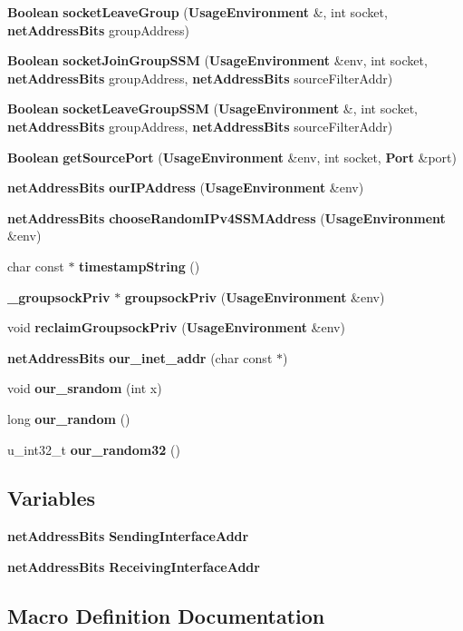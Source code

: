 \begin{DoxyCompactItemize}
\item 
{\bf Boolean} {\bf socket\+Leave\+Group} ({\bf Usage\+Environment} \&, int socket, {\bf net\+Address\+Bits} group\+Address)
\item 
{\bf Boolean} {\bf socket\+Join\+Group\+S\+S\+M} ({\bf Usage\+Environment} \&env, int socket, {\bf net\+Address\+Bits} group\+Address, {\bf net\+Address\+Bits} source\+Filter\+Addr)
\item 
{\bf Boolean} {\bf socket\+Leave\+Group\+S\+S\+M} ({\bf Usage\+Environment} \&, int socket, {\bf net\+Address\+Bits} group\+Address, {\bf net\+Address\+Bits} source\+Filter\+Addr)
\item 
{\bf Boolean} {\bf get\+Source\+Port} ({\bf Usage\+Environment} \&env, int socket, {\bf Port} \&port)
\item 
{\bf net\+Address\+Bits} {\bf our\+I\+P\+Address} ({\bf Usage\+Environment} \&env)
\item 
{\bf net\+Address\+Bits} {\bf choose\+Random\+I\+Pv4\+S\+S\+M\+Address} ({\bf Usage\+Environment} \&env)
\item 
char const $\ast$ {\bf timestamp\+String} ()
\item 
{\bf \+\_\+groupsock\+Priv} $\ast$ {\bf groupsock\+Priv} ({\bf Usage\+Environment} \&env)
\item 
void {\bf reclaim\+Groupsock\+Priv} ({\bf Usage\+Environment} \&env)
\item 
{\bf net\+Address\+Bits} {\bf our\+\_\+inet\+\_\+addr} (char const $\ast$)
\item 
void {\bf our\+\_\+srandom} (int x)
\item 
long {\bf our\+\_\+random} ()
\item 
u\+\_\+int32\+\_\+t {\bf our\+\_\+random32} ()
\end{DoxyCompactItemize}
\subsection*{Variables}
\begin{DoxyCompactItemize}
\item 
{\bf net\+Address\+Bits} {\bf Sending\+Interface\+Addr}
\item 
{\bf net\+Address\+Bits} {\bf Receiving\+Interface\+Addr}
\end{DoxyCompactItemize}


\subsection{Macro Definition Documentation}

